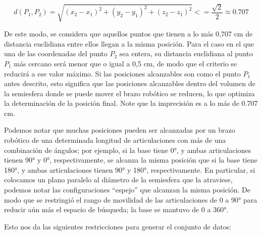 \begin{equation}
	d(P_1, P_2) = \sqrt{(x_2 - x_1)^2 + (y_2 - y_1)^2 + (z_2 - z_1)^2} <= \frac{\sqrt{2}}{2} \approx 0.707
\end{equation}

De este modo, se considera que aquellos puntos que tienen a lo más 0,707 cm de distancia euclidiana entre ellos llegan a la misma posición. Para el caso en el que una de las coordenadas del punto $P_2$ sea entera, su distancia euclidiana al punto $P_1$ más cercano será menor que o igual a 0,5 cm, de modo que el criterio se reducirá a ese valor máximo. Si las posiciones alcanzables son como el punto $P_1$ antes descrito, esto significa que las posiciones alcanzables dentro del volumen de la semiesfera donde se puede mover el brazo robótico se reducen, lo que optimiza la determinación de la posición final. Note que la imprecisión es a lo más de 0.707 cm. 

Podemos notar que muchas posiciones pueden ser alcanzadas por un brazo robótico de una determinada longitud de articulaciones con más de una combinación de ángulos; por ejemplo, si la base tiene 0°, y ambas articulaciones tienen 90° y 0°, respectivamente, se alcanza la misma posición que si la base tiene 180°, y ambas articulaciones tienen 90° y 180°, respectivamente. En particular, si colocamos un plano paralelo al diámetro de la semiesfera que la atraviese, podemos notar las configuraciones ``espejo'' que alcanzan la misma posición. De modo que se restringió el rango de movilidad de las articulaciones de 0 a 90° para reducir aún más el espacio de búsqueda; la base se mantuvo de 0 a 360°. 


Esto nos da las siguientes restricciones para generar el conjunto de datos:

